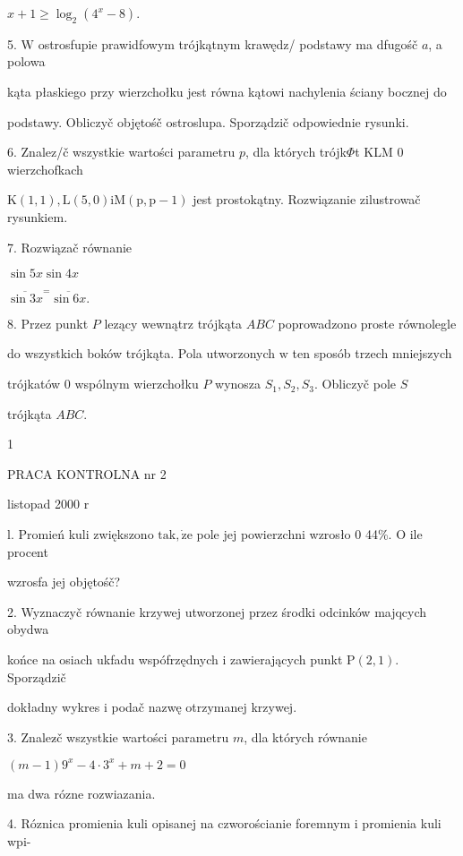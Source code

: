 \documentclass[a4paper,12pt]{article}
\begin{document}
$x+1\geq\log_{2}(4^{x}-8).$

5. $\mathrm{W}$ ostrosfupie prawidfowym trójkątnym krawędz/ podstawy ma dfugośč $a$, a polowa

kąta płaskiego przy wierzchołku jest równa kątowi nachylenia ściany bocznej do

podstawy. Obliczyč objętośč ostroslupa. Sporządzič odpowiednie rysunki.

6. Znalez/č wszystkie wartości parametru $p$, dla których trójk$\Phi$t KLM $0$ wierzchofkach

$\mathrm{K}(1,1), \mathrm{L}(5,0)\mathrm{i}\mathrm{M}(\mathrm{p},\mathrm{p}-1)$ jest prostokątny. Rozwiązanie zilustrowač rysunkiem.

7. Rozwiązač równanie

$\sin 5x\sin 4x$

$\overline{\sin 3x}^{=}\overline{\sin 6x}.$

8. Przez punkt $P$ lezący wewnątrz trójkąta $ABC$ poprowadzono proste równolegle

do wszystkich boków trójkąta. Pola utworzonych $\mathrm{w}$ ten sposób trzech mniejszych

trójkatów $0$ wspólnym wierzchołku $P$ wynosza $S_{1}, S_{2}, S_{3}$. Obliczyč pole $S$

trójkąta $ABC.$

1




PRACA KONTROLNA nr 2

listopad 2000 $\mathrm{r}$

l. Promień kuli zwiększono $\mathrm{t}\mathrm{a}\mathrm{k}, \dot{\mathrm{z}}\mathrm{e}$ pole jej powierzchni wzrosło $0$ 44\%. $\mathrm{O}$ ile procent

wzrosfa jej objętośč?

2. Wyznaczyč równanie krzywej utworzonej przez środki odcinków majqcych obydwa

końce na osiach ukfadu wspófrzędnych $\mathrm{i}$ zawierających punkt $\mathrm{P}(2,1)$. Sporządzič

dokładny wykres $\mathrm{i}$ podač nazwę otrzymanej krzywej.

3. Znalez$\acute{}$č wszystkie wartości parametru $m$, dla których równanie

$(m-1)9^{x}-4\cdot 3^{x}+m+2=0$

ma dwa rózne rozwiazania.

4. Róznica promienia kuli opisanej na czworościanie foremnym $\mathrm{i}$ promienia kuli wpi-
\end{document}
